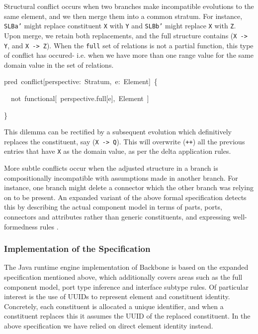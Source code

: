 Structural conflict occurs when two branches make incompatible evolutions
to the same element, and we then merge them into a common stratum.
For instance, \texttt{SLBa\textquoteright{}} might replace constituent
\texttt{X} with \texttt{Y} and \texttt{SLBb\textquoteright{}} might
replace \texttt{X} with \texttt{Z}. Upon merge, we retain both replacements,
and the full structure contains (\texttt{X -> Y}, and \texttt{X ->
Z}). When the \texttt{full} set of relations is not a partial function,
this type of conflict has occured- i.e. when we have more than one
range value for the same domain value in the set of relations.
\begin{lyxcode}
{\footnotesize{}pred~conflict{[}perspective:~Stratum,~e:~Element{]}~\{}{\footnotesize \par}

{\footnotesize{}~~not~functional{[}~perspective.full{[}e{]},~Element~{]}}{\footnotesize \par}

{\footnotesize{}\}}{\footnotesize \par}
\end{lyxcode}
This dilemma can be rectified by a subsequent evolution which definitively
replaces the constituent, say (\texttt{X -> Q}). This will overwrite
(\texttt{++}) all the previous entries that have \texttt{X} as the
domain value, as per the delta application rules.

More subtle conflicts occur when the adjusted structure in a branch
is compositionally incompatible with assumptions made in another branch.
For instance, one branch might delete a connector which the other
branch was relying on to be present. An expanded variant of the above
formal specification detects this by describing the actual component
model in terms of parts, ports, connectors and attributes rather than
generic constituents, and expressing well-formedness rules \cite{McVeigh2009}.


\subsubsection{Implementation of the Specification}

The Java runtime engine implementation of Backbone is based on the
expanded specification mentioned above, which additionally covers
areas such as the full component model, port type inference and interface
subtype rules. Of particular interest is the use of UUIDs to represent
element and constituent identity. Concretely, each constituent is
allocated a unique identifier, and when a constituent replaces this
it assumes the UUID of the replaced constituent. In the above specification
we have relied on direct element identity instead.


